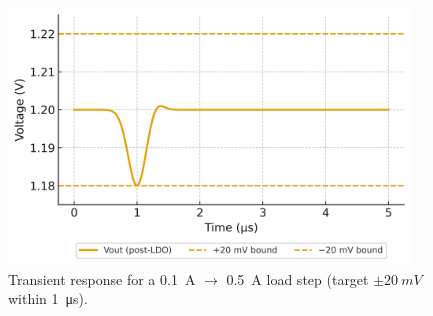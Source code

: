 \documentclass[journal]{IEEEtran}
\begin{document}
\begin{figure}[t]
\centering
\includegraphics[width=0.95\textwidth]{fig5_transient_response.png}
\caption{Transient response for a \SI{0.1}{A} $\to$ \SI{0.5}{A} load step (target $\pm\SI{20}{mV}$ within \SI{1}{\micro s}).}
\label{fig5}
\end{figure}
\end{document}
